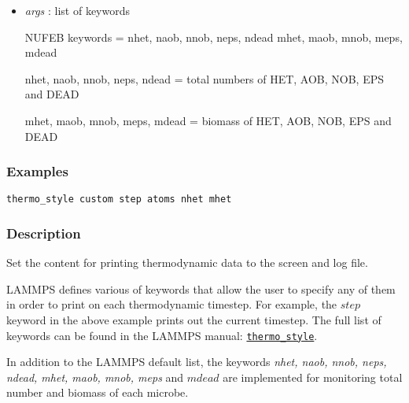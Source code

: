 \documentclass[11pt,a4paper,openright]{article}
\begin{document}
\begin{itemize}
\item
	{\it args }: list of keywords
		 
		 NUFEB keywords = nhet, naob, nnob, neps, ndead
		 mhet, maob, mnob, meps, mdead
		 
		nhet, naob, nnob, neps, ndead = total numbers of HET, AOB, NOB, EPS and DEAD
		 
		mhet, maob, mnob, meps, mdead = biomass of HET, AOB, NOB, EPS and DEAD
		 
\end{itemize}

\subsubsection*{Examples}
\begin{Verbatim}[frame=single]
thermo_style custom step atoms nhet mhet
\end{Verbatim}


\subsubsection*{Description}
Set the content for printing thermodynamic data to the screen and log file.

LAMMPS defines various of keywords that allow the user
to specify any of them in order to print on each thermodynamic timestep. For example, the $step$ keyword
in the above example prints out the current timestep. The full list of keywords can be found in the LAMMPS manual: \href{http://lammps.sandia.gov/doc/thermo_style.html}{\tt thermo\_style}.

In addition to the LAMMPS default list, the keywords {\it nhet, naob, nnob, neps, ndead, mhet, maob, mnob, meps} and $mdead$ are implemented for monitoring total number and biomass of each microbe.
\end{document}
